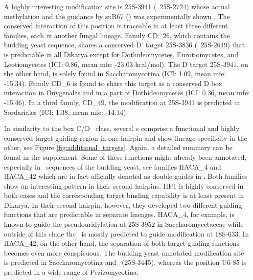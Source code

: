 A highly interesting modification site is 25S-3941 (\sce\ 25S-2724)
whose actual methylation and the guidance by snR67 (\sce) was experimentally shown
\cite{Lowe:1999}. The conserved interaction of this position is
traceable in at least three different families, each in another fungal
lineage. Family CD\_26, which contains the budding yeast
sequence, shares a conserved D' target 25S-3836 (\sce\ 25S-2619)
that is predictable in all Dikarya except for Dothideomycetes,
Eurotiomycetes, and Leotiomycetes (ICI: 0.86, mean mfe: -23.03
kcal/mol). The D target 25S-3941, on the other hand,
is solely found in Saccharomycotina (ICI: 1.09, mean mfe: -15.34). Family CD\_6 is found to share this target as a conserved D box
interaction in Onygenales and in a part of Dothideomycetes (ICI: 0.36, mean mfe:
-15.46). In a third family, CD\_49, the
modification at 25S-3941 is predicted in Sordariales (ICI: 1.38, mean
mfe: -14.14).

In similarity to the box C/D \sno\ class, several \haca s comprise a
functional and highly conserved target guiding region in one hairpin
and show lineage-specificity in the other, see Figure \ref{fig:additional_targets}. 
Again, a detailed summary can be found in the
supplement. Some of these functions might already been annotated, 
especially in \sno\ sequences of the budding yeast, see families
HACA\_4 and HACA\_42 which are in fact officially denoted as double guides
in \sce. Both families show an interesting pattern in their second
hairpins.  HP1 is highly conserved in both cases and the corresponding
target binding capability is at least present in Dikarya. In their second hairpin,
however, they developed two different guiding functions that are
predictable in separate lineages. HACA\_4, for example, is known to
guide the pseudouridylation at 25S-3952 in Saccharomycetaceae while
outside of this clade the \sno\ is mostly predicted to guide modification
at 18S-633. In HACA\_42, on the other hand, the separation of both
target guiding functions becomes even more conspicuous. The budding yeast
annotated modification site is predicted in Saccharomycotina and \Tde\
(25S-3445), whereas the position U6-85 is predicted in a wide range of
Pezizomycotina.

